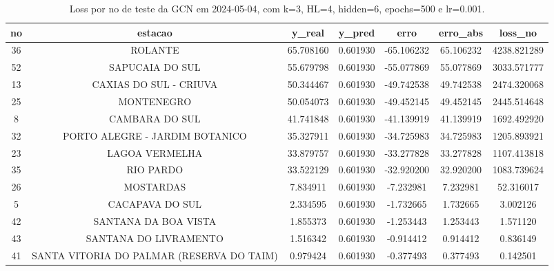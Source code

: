 \begin{table}[h]
\centering
\caption{Loss por no de teste da GCN em 2024-05-04, com k=3, HL=4, hidden=6, epochs=500 e lr=0.001.}
\label{tab:gcn_loss_k3_hl4_h6_e500_d20240504}
\begin{tabular}{ccccccc}
\toprule
no & estacao & y\_real & y\_pred & erro & erro\_abs & loss\_no \\
\midrule
36 & ROLANTE & 65.708160 & 0.601930 & -65.106232 & 65.106232 & 4238.821289 \\
52 & SAPUCAIA DO SUL & 55.679798 & 0.601930 & -55.077869 & 55.077869 & 3033.571777 \\
13 & CAXIAS DO SUL - CRIUVA & 50.344467 & 0.601930 & -49.742538 & 49.742538 & 2474.320068 \\
25 & MONTENEGRO & 50.054073 & 0.601930 & -49.452145 & 49.452145 & 2445.514648 \\
8 & CAMBARA DO SUL & 41.741848 & 0.601930 & -41.139919 & 41.139919 & 1692.492920 \\
32 & PORTO ALEGRE - JARDIM BOTANICO & 35.327911 & 0.601930 & -34.725983 & 34.725983 & 1205.893921 \\
23 & LAGOA VERMELHA & 33.879757 & 0.601930 & -33.277828 & 33.277828 & 1107.413818 \\
35 & RIO PARDO & 33.522129 & 0.601930 & -32.920200 & 32.920200 & 1083.739624 \\
26 & MOSTARDAS & 7.834911 & 0.601930 & -7.232981 & 7.232981 & 52.316017 \\
5 & CACAPAVA DO SUL & 2.334595 & 0.601930 & -1.732665 & 1.732665 & 3.002126 \\
42 & SANTANA DA BOA VISTA & 1.855373 & 0.601930 & -1.253443 & 1.253443 & 1.571120 \\
43 & SANTANA DO LIVRAMENTO & 1.516342 & 0.601930 & -0.914412 & 0.914412 & 0.836149 \\
41 & SANTA VITORIA DO PALMAR (RESERVA DO TAIM) & 0.979424 & 0.601930 & -0.377493 & 0.377493 & 0.142501 \\
\bottomrule
\end{tabular}
\end{table}
